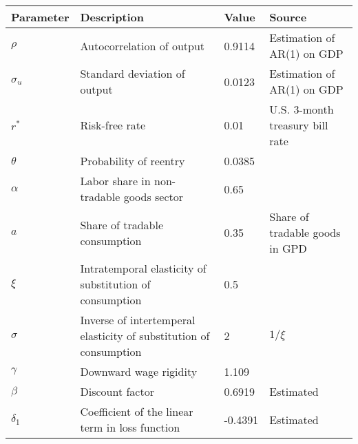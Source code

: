 \begin{table}[h]
    \centering
    \begin{tabular}{@{}llll@{}}
        \toprule
    Parameter  & Description                                                       & Value  & Source                                                                         \\ \midrule
    $\rho$     & Autocorrelation of output                                         & 0.9114  & Estimation of AR(1) on GDP\\
    $\sigma_u$ & Standard deviation of output                                      & 0.0123 & Estimation of AR(1) on GDP \\
    $r^*$      & Risk-free rate                                                    & 0.01 & U.S. 3-month treasury bill rate \\
    $\theta$   & Probability of reentry                                            & 0.0385 & \citet*{Chatterjee-12}                                              \\
    $\alpha$   & Labor share in non-tradable goods sector                          & 0.65   & \citet{Jegajeevan-Sri-Lanka-DSGE}                                                       \\
    $a$        & Share of tradable consumption                                     & 0.35   & Share of tradable goods in GPD                  \\
    $\xi$      & Intratemporal elasticity of substitution of consumption & 0.5   & \citet{Na-18}                             \\
    $\sigma$   & Inverse of intertemperal elasticity of substitution of consumption  & 2   & $1 / \xi$                                                                      \\
    $\gamma$   & Downward wage rigidity                                            & 1.109   & \citet*{wage-rigidity-data}                  \\
    $\beta$    & Discount factor                                                   & 0.6919  &  Estimated                                                                              \\
    $\delta_1$ & Coefficient of the linear term in loss function                   &  -0.4391 &   Estimated                                                                             \\

\end{tabular}
\end{table}
